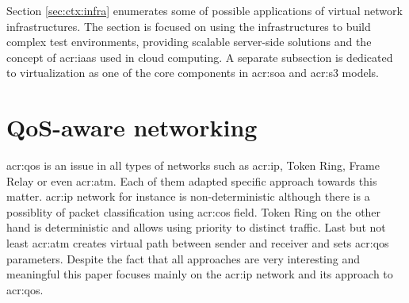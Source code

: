 \documentclass[11pt]{book}
\begin{document}
    Section \ref{sec:ctx:infra} enumerates some of possible applications of virtual network infrastructures. The section
    is focused on using the infrastructures to build complex test environments, providing scalable server-side solutions
    and the concept of \gls{acr:iaas} used in cloud computing. A separate subsection is dedicated to virtualization as
    one of the core components in \gls{acr:soa} and \gls{acr:s3} models.





    \section{QoS-aware networking}
    \label{sec:ctx:qos}


      \gls{acr:qos} is an issue in all types of networks such as \gls{acr:ip}, Token Ring, Frame Relay or even
      \gls{acr:atm}.  Each of them adapted specific approach towards this matter. \gls{acr:ip} network for instance is
      non-deterministic although there is a possiblity of packet classification using \gls{acr:cos} field. Token Ring on
      the other hand is deterministic and allows using priority to distinct traffic. Last but not least \gls{acr:atm}
      creates virtual path between sender and receiver and sets \gls{acr:qos} parameters. Despite the fact that all
      approaches are very interesting and meaningful this paper focuses mainly on the \gls{acr:ip} network and its
      approach to \gls{acr:qos}.
\end{document}
